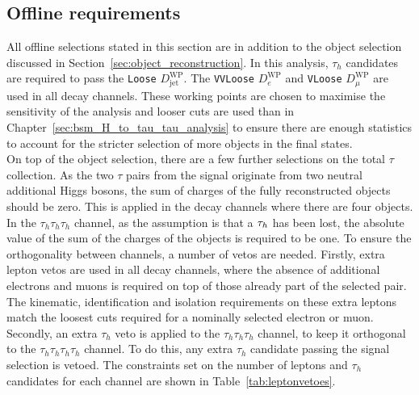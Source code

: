 \subsection{Offline requirements}

All offline selections stated in this section are in addition to the object selection discussed in Section~\ref{sec:object_reconstruction}.
In this analysis, $\tau_h$ candidates are required to pass the \texttt{Loose} $D_{\text{jet}}^{\text{WP}}$.
The \texttt{VVLoose} $D_{e}^{\text{WP}}$ and \texttt{VLoose} $D_{\mu}^{\text{WP}}$ are used in all decay channels.
These working points are chosen to maximise the sensitivity of the analysis and looser cuts are used than in Chapter~\ref{sec:bsm_H_to_tau_tau_analysis} to ensure there are enough statistics to account for the stricter selection of more objects in the final states. \\

On top of the object selection, there are a few further selections on the total $\tau$ collection.
As the two $\tau$ pairs from the signal originate from two neutral additional Higgs bosons, the sum of charges of the fully reconstructed objects should be zero. 
This is applied in the decay channels where there are four objects. 
In the $\tau_h \tau_h \tau_h$ channel, as the assumption is that a $\tau_{h}$ has been lost, the absolute value of the sum of the charges of the objects is required to be one.
To ensure the orthogonality between channels, a number of vetos are needed. 
Firstly, extra lepton vetos are used in all decay channels, where the absence of additional electrons and muons is required on top of those already part of the selected pair.
The kinematic, identification and isolation requirements on these extra leptons match the loosest cuts required for a nominally selected electron or muon.
Secondly, an extra $\tau_h$ veto is applied to the $\tau_h \tau_h \tau_h$ channel, to keep it orthogonal to the $\tau_h \tau_h \tau_h \tau_h$ channel.
To do this, any extra $\tau_h$ candidate passing the signal selection is vetoed.
The constraints set on the number of leptons and $\tau_h$ candidates for each channel are shown in Table~\ref{tab:leptonvetoes}. \\

